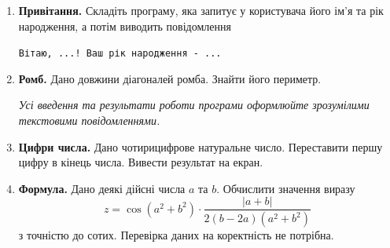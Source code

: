 \begin{enumerate}

\item \textbf{Привітання.} Складіть програму, яка запитує у користувача його ім'я та рік народження, а потім виводить повідомлення

\verb|Вітаю, ...! Ваш рік народження - ...|

\item \textbf{Ромб.} Дано довжини діагоналей ромба. Знайти його периметр.

{\itshape Усі введення та результати роботи програми оформлюйте зрозумілими текстовими повідомленнями.}

\item \textbf{Цифри числа.} Дано чотирицифрове натуральне число. Переставити першу цифру в кінець числа. Вивести результат на екран.

\item \textbf{Формула.} Дано деякі дійсні числа $a$ та $b$. Обчислити значення виразу
$$
z=\cos(a^2+b^2)\cdot\dfrac{|a+b|}{2(b-2a)(a^2+b^2)}
$$
з точністю до сотих. Перевірка даних на коректність не потрібна.
\end{enumerate}





